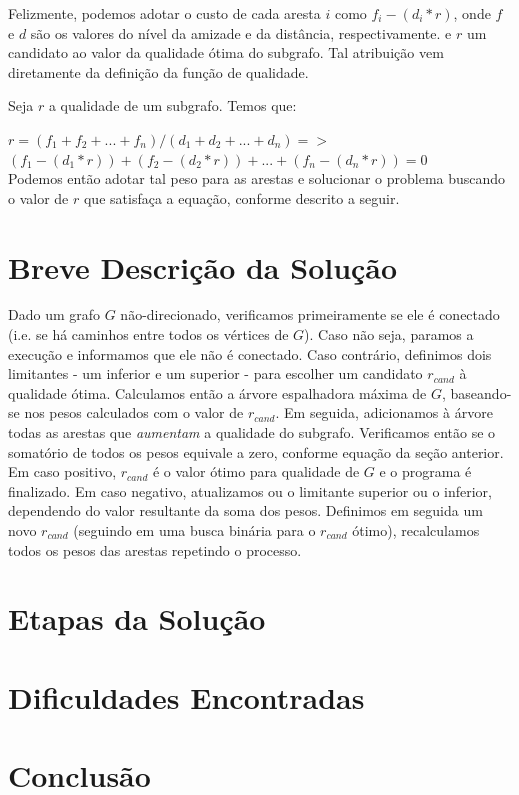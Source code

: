 \documentclass[a4paper,12pt,titlepage]{article}
\begin{document}
Felizmente, podemos adotar o custo de cada aresta $i$ como $f_i - (d_i * r)$, onde $f$ e $d$ são os valores do nível da amizade e da distância, respectivamente. e $r$ um candidato ao valor da qualidade ótima do subgrafo. Tal atribuição vem diretamente da definição da função de qualidade.

Seja $r$ a qualidade de um subgrafo. Temos que:

$ r = (f_1 + f_2 + ... + f_n)  /  (d_1 + d_2 + ... + d_n) => $
\ \\  

$ (f_1 - (d_1 * r)) + (f_2 - (d_2 * r)) + ... + (f_n - (d_n * r)) = 0 $
\ \\ 

Podemos então adotar tal peso para as arestas e solucionar o problema buscando o valor de $r$ que satisfaça a equação, conforme descrito a seguir.

\section{Breve Descrição da Solução}

Dado um grafo $G$ não-direcionado, verificamos primeiramente se ele é conectado (i.e. se há caminhos entre todos os vértices de $G$). Caso não seja, paramos a execução e informamos que ele não é conectado. Caso contrário, definimos dois limitantes - um inferior e um superior - para escolher um candidato $r_{cand}$ à qualidade ótima. Calculamos então a árvore espalhadora máxima de $G$, baseando-se nos pesos calculados com o valor de $r_{cand}$. Em seguida, adicionamos à árvore todas as arestas que \textit{aumentam} a qualidade do subgrafo. Verificamos então se o somatório de todos os pesos equivale a zero, conforme equação da seção anterior. Em caso positivo, $r_{cand}$ é o valor ótimo para qualidade de $G$ e o programa é finalizado. Em caso negativo, atualizamos ou o limitante superior ou o inferior, dependendo do valor resultante da soma dos pesos. Definimos em seguida um novo $r_{cand}$ (seguindo em uma busca binária para o $r_{cand}$ ótimo), recalculamos todos os pesos das arestas repetindo o processo.

\section{Etapas da Solução}

\section{Dificuldades Encontradas}

\section{Conclusão}

\cite{cormen} 


\newpage
\end{document}
